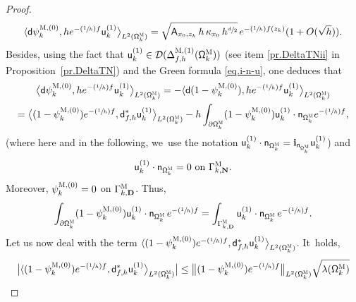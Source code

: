 \documentclass[10pt]{amsart}
\newcommand{\Psfrac}[2]{(\sfrac{#1}{#2})}
\newcommand{\mbf}[1]{\mathbf{#1}}
\let\pa\partial
\theoremstyle{plain}
\theoremstyle{definition}
\begin{document}
\begin{proof}
\begin{equation}\label{eq.P11}
\langle \mathsf d \psi^{\textsc{M},(0)}_k, h e^{-\Psfrac 1hf} \mathsf u^{(1)}_k \big \rangle_{ L^2(\mathsf \Omega_k^{\textsc{M}})}=\sqrt{\mathsf A_{x_0,z_k}\, h\, \kappa_{x_0}\, h^{\sfrac d2}}\, e^{-\Psfrac 1h f(z_k)} (1+O(\sqrt h)).
\end{equation}
\pagebreak[2]
Besides, using the fact that $\mathsf
u^{(1)}_k \in \mathcal D(\Delta_{f,h}^{\textsc{M},(1)} (\mathsf
\Omega_k^{\textsc{M}}))$ (see item \eqref{pr.DeltaTNii} in
Proposition~\ref{pr.DeltaTN}) and the Green formula \eqref{eq.i-n-u}, one deduces that
\begin{multline}
\label{eq.P12}
\bigl\langle \mathsf d \psi^{\textsc{M},(0)}_k, h e^{-\Psfrac 1hf} \mathsf u^{(1)}_k \big \rangle_{ L^2(\mathsf \Omega_k^{\textsc{M}})}= -\langle \mathsf d (1- \psi^{\textsc{M},(0)}_k), h e^{-\Psfrac 1hf} \mathsf u^{(1)}_k \big \rangle_{ L^2(\mathsf \Omega_k^{\textsc{M}})}\\
= \bigl\langle (1- \psi^{\textsc{M},(0)}_k) e^{-\Psfrac 1hf}, \mathsf d_{f,h}^* \mathsf u^{(1)}_k \big \rangle_{ L^2(\mathsf \Omega_k^{\textsc{M}})} -h\int_{\pa \mathsf \Omega_k^{\textsc{M}}} (1- \psi^{\textsc{M},(0)}_k) \mathsf u^{(1)}_k \cdot \mathsf n_{ \mathsf \Omega_k^{\textsc{M}} } e^{-\Psfrac 1hf},
\end{multline}
(where here and in the following, we~use the notation $ \mathsf
u^{(1)}_k \cdot \mathsf n_{ \mathsf \Omega_k^{\textsc{M}}
}=\mathbf{i}_{\mathsf n_{ \mathsf \Omega_k^{\textsc{M}}
}} \mathsf
u^{(1)}_k$) and
\[
\mathsf u^{(1)}_k
\cdot \mathsf n_{ \mathsf \Omega_k^{\textsc{M}} }= 0 \text{ on } \Gamma_{k,\mbf N}^{\textsc{M}}.
\]
Moreover, $\psi^{\textsc{M},(0)}_k=0$ on $\Gamma_{k,\mbf
D}^{\textsc{M}}$. Thus,
\begin{equation}\label{eq.P13}
\int_{\pa \mathsf \Omega_k^{\textsc{M}}} (1- \psi^{\textsc{M},(0)}_k) \mathsf u^{(1)}_k \cdot \mathsf n_{ \mathsf \Omega_k^{\textsc{M}} } \, e^{-\Psfrac 1hf}=\int_{\Gamma_{k,\mbf D}^{\textsc{M}}} \mathsf u^{(1)}_k \cdot \mathsf n_{ \mathsf \Omega_k^{\textsc{M}} } \, e^{-\Psfrac 1hf}.
\end{equation}
Let us now deal with the term $\langle (1- \psi^{\textsc{M},(0)}_k) e^{-\Psfrac 1hf}, \mathsf d_{f,h}^* \mathsf u^{(1)}_k \big \rangle_{ L^2(\mathsf \Omega_k^{\textsc{M}})}$. It~holds,
\begin{align*}
\bigl \vert \langle (1- \psi^{\textsc{M},(0)}_k) e^{-\Psfrac 1hf}, \mathsf d_{f,h}^* \mathsf u^{(1)}_k \bigr \rangle_{ L^2(\mathsf \Omega_k^{\textsc{M}})}\big \vert &\le\bigl \Vert (1- \psi^{\textsc{M},(0)}_k) e^{-\Psfrac 1hf} \bigr \Vert_{ L^2(\mathsf \Omega_k^{\textsc{M}})} \sqrt{\lambda(\mathsf \Omega_k^{\textsc{M}}) }\\

\end{align*}
\end{proof}
\end{document}
